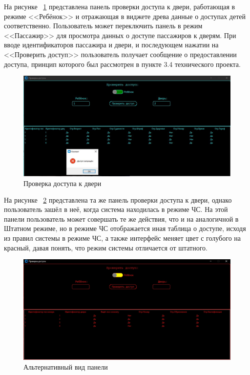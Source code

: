 На рисунке ~\ref{fig:example10} представлена панель проверки доступа к двери, работающая в режиме <<Ребёнок>> и отражающая в виджете древа данные о доступах детей соответственно. Пользователь может переключить панель в режим <<Пассажир>> для просмотра данных о доступе пассажиров к дверям. При вводе идентификаторов пассажира и двери, и последующем нажатии на <<Проверить доступ>> пользователь получает сообщение о предоставлении доступа, принцип которого был рассмотрен в пункте 3.4 технического проекта.
\begin{figure}[H]
	\centering
	\includegraphics[width=1.0\linewidth]{images/Example10}
	\caption{Проверка доступа к двери}
	\label{fig:example10}
\end{figure}

На рисунке ~\ref{fig:example11} представлена та же панель проверки доступа к двери, однако пользователь зашёл в неё, когда система находилась в режиме ЧС. На этой панели пользователь может совершать те же действия, что и на аналогичной в Штатном режиме, но в режиме ЧС отображается иная таблица о доступе, исходя из правил системы в режиме ЧС, а также интерфейс меняет цвет с голубого на красный, давая понять, что режим системы отличается от штатного.
\begin{figure}[H]
	\centering
	\includegraphics[width=1.0\linewidth]{images/Example11}
	\caption{Альтернативный вид панели}
	\label{fig:example11}
\end{figure}

\newpage